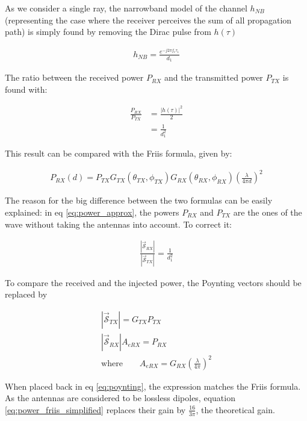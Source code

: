 \documentclass[10pt,a4paper]{ULBreport}
\begin{document}
As we consider a single ray, the narrowband model of the channel $h_{NB}$ (representing the case where the receiver perceives the sum of all propagation path) is simply found by removing the Dirac pulse from $h(\tau)$

\begin{align*}
    h_{NB} = \frac{e^{-j2\pi f_c \tau_1}}{d_1}
\end{align*}

The ratio between the received power $P_{RX}$ and the transmitted power $P_{TX}$ is found with:

\begin{align}
    \frac{P_{RX}}{P_{TX}} &= \frac{\left| h(\tau) \right|^2}{2} \nonumber\\
    &= \frac{1}{d_1^2}
    \label{eq:power_approx}
\end{align}

This result can be compared with the Friis formula, given by:

\begin{align}
    P_{RX}(d) = P_{TX} G_{TX}(\theta_{TX}, \phi_{TX})G_{RX}(\theta_{RX}, \phi_{RX})\left(\frac{\lambda}{4\pi d}\right)^2
    \label{eq:friis_formula}
\end{align}

The reason for the big difference between the two formulas can be easily explained: in eq \ref{eq:power_approx}, the powers $P_{RX}$ and $P_{TX}$ are the ones of the wave without taking the antennas into account. To correct it:

\begin{align}
    \frac{\left|\bm{\vec{\mathscr{S}}}_{RX}\right|}{\left|\bm{\vec{\mathscr{S}}}_{TX}\right|} = \frac{1}{d_1^2}
    \label{eq:poynting}
\end{align}

To compare the received and the injected power, the Poynting vectors should be replaced by

\begin{align*}
    \left|\bm{\vec{\mathscr{S}}}_{TX}\right| = G_{TX} P_{TX}\\
    \left|\bm{\vec{\mathscr{S}}}_{RX}\right| A_{eRX} = P_{RX}\\
    \text{where} \quad \quad A_{eRX} = G_{RX}\left(\frac{\lambda}{4\pi}\right)^2
\end{align*}

When placed back in eq \ref{eq:poynting}, the expression matches the Friis formula. As the antennas are considered to be lossless dipoles, equation \ref{eq:power_friis_simplified} replaces their gain by $\frac{16}{3\pi}$, the theoretical gain.
\end{document}
